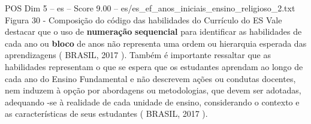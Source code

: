 \begin{textsample}{POS Dim 5 – es – Score 9.00 – es/es\_ef\_anos\_iniciais\_ensino\_religioso\_2.txt}
Figura 30 - Composição do código das habilidades do Currículo do ES Vale destacar que o uso de \textbf{numeração} \textbf{sequencial} para identificar as habilidades de cada ano ou \textbf{bloco} de anos não representa uma ordem ou hierarquia esperada das aprendizagens ( BRASIL, 2017 ).
Também é importante ressaltar que as habilidades representam o que se espera que os estudantes aprendam ao longo de cada ano do Ensino Fundamental e não descrevem ações ou condutas docentes, nem induzem à opção por abordagens ou metodologias, que devem ser adotadas, adequando -se à realidade de cada unidade de ensino, considerando o contexto e as características de seus estudantes ( BRASIL, 2017 ).

\end{textsample}
